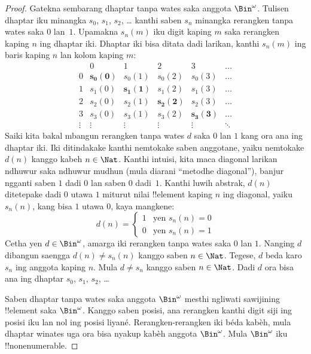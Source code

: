 \documentclass[../../../include/open-logic-section]{subfiles}
\begin{document}
\begin{proof}
Gatekna sembarang dhaptar tanpa wates saka anggota $\Bin^\omega$.
Tulisen dhaptar iku minangka $s_{0}$, $s_{1}$, $s_{2}$, \dots{}
kanthi saben $s_n$ minangka rerangken tanpa wates saka $0$ lan~$1$.
Upamakna $s_n(m)$ iku digit kaping $m$ saka rerangken kaping $n$
ing dhaptar iki. Dhaptar iki bisa ditata dadi larikan,
kanthi $s_n(m)$ ing baris kaping $n$ lan kolom kaping $m$:
\[
\begin{array}{c|c|c|c|c|c}
& 0 & 1 & 2 & 3 & \dots \\\hline
0 & \mathbf{s_{0}(0)} & s_{0}(1) & s_{0}(2) & s_0(3) & \dots \\\hline
1 & s_{1}(0)& \mathbf{s_{1}(1)} & s_1(2) & s_1(3) & \dots \\\hline
2 & s_{2}(0)& s_{2}(1) & \mathbf{s_2(2)} & s_2(3) & \dots \\\hline
3 & s_{3}(0)& s_{3}(1) & s_3(2) & \mathbf{s_3(3)} & \dots \\\hline
\vdots & \vdots & \vdots & \vdots & \vdots & \mathbf{\ddots}
\end{array}
\]
Saiki kita bakal mbangun rerangken tanpa wates $d$ saka $0$ lan $1$
kang ora ana ing dhaptar iki. Iki ditindakake kanthi nemtokake saben
anggotane, yaiku nemtokake $d(n)$ kanggo kabeh $n \in \Nat$.
Kanthi intuisi, kita maca diagonal larikan ndhuwur saka ndhuwur mudhun
(mula diarani ``metodhe diagonal''), banjur ngganti saben $1$ dadi $0$
lan saben $0$ dadi~$1$. Kanthi luwih abstrak, $d(n)$ ditetepake dadi
$0$ utawa $1$ miturut nilai !!{element} kaping $n$ ing diagonal,
yaiku $s_n(n)$, kang bisa $1$ utawa $0$, kaya mangkene:
\[
d(n) =
\begin{cases}
1 & \text{yen $s_{n}(n) = 0$}\\
0 & \text{yen $s_{n}(n) = 1$}
\end{cases}
\]
Cetha yen $d \in \Bin^\omega$, amarga iki rerangken tanpa wates
saka $0$ lan $1$. Nanging $d$ dibangun saengga $d(n) \neq s_n(n)$
kanggo saben $n \in \Nat$. Tegese, $d$ beda karo $s_n$
ing anggota kaping $n$. Mula $d \neq s_n$ kanggo saben $n\in \Nat$.
Dadi $d$ ora bisa ana ing dhaptar
$s_0$, $s_1$, $s_2$,
\dots

Saben dhaptar tanpa wates saka anggota $\Bin^\omega$
mesthi ngliwati sawijining !!{element} saka $\Bin^\omega$.
Kanggo saben posisi, ana rerangken kanthi digit siji ing posisi iku
lan nol ing posisi liyané. Rerangken-rerangken iki béda kabèh, mula
dhaptar winates uga ora bisa nyakup kabèh anggota $\Bin^\omega$.
Mula $\Bin^\omega$ iku !!{nonenumerable}.
\end{proof}
\end{document}
